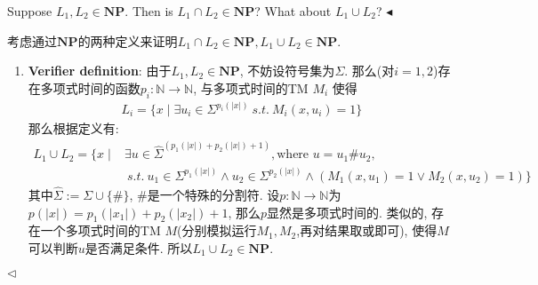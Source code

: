 \documentclass[11pt]{article}
\newcommand{\NP}{\mathbf{NP}}
\newenvironment{problem}[2][Problem]{\begin{trivlist}
\item[\hskip \labelsep{\bfseries#1}\hskip\labelsep{\bfseries#2.}]}{\hfill$\blacktriangleleft$\end{trivlist}}
\newenvironment{answer}[1][Answer]{\begin{trivlist}
\item[\hskip \labelsep{\bfseries\itshape#1.}\hskip \labelsep]}{\hfill$\lhd$\end{trivlist}}
\begin{document}
\begin{problem}{2.(14 points)}
    Suppose $L_1, L_2 \in \NP$. Then is $L_1 \cap L_2 \in \mathbf{NP}$? What about $L_1 \cup L_2$?
\end{problem}
\begin{answer}
   考虑通过$\NP$的两种定义来证明$L_1\cap L_2 \in \NP, L_1\cup L_2 \in \NP$.
   \begin{enumerate}[label = (\arabic*)]
    \item \textbf{Verifier definition}: 由于$L_1, L_2 \in \NP$, 不妨设符号集为$\Sigma$. 那么(对$i = 1,2$)存在多项式时间的函数$p_i: \mathbb{N} \rightarrow \mathbb{N}$, 与多项式时间的TM $M_i$ 使得
    \begin{align*}
        L_i = \{x \mid \exists u_i \in \Sigma^{p_i(|x|)} ~s.t.~ M_i(x,u_i) = 1\} 
    \end{align*}
    那么根据定义有:
    \begin{align*}
        L_1 \cup L_2 = \{x \mid &\exists u \in \widehat{\Sigma}^{(p_1(|x|) + p_2(|x|) + 1)}, \text{where }u = u_1\#u_2, \\
        &~s.t.~ u_1 \in \Sigma^{p_1(|x|)} \land u_2 \in \Sigma^{p_2(|x|)} \land(M_1(x,u_1) = 1 \lor M_2(x,u_2) = 1) \}  
    \end{align*}
    其中$\widehat{\Sigma} := \Sigma \cup \{\#\}$, $\#$是一个特殊的分割符. 设$p: \mathbb{N} \rightarrow \mathbb{N}$为$p(|x|) = p_1(|x_1|) + p_2(|x_2|)+1$, 那么$p$显然是多项式时间的. 类似的, 存在一个多项式时间的TM $M$(分别模拟运行$M_1,M_2$,再对结果取或即可), 使得$M$可以判断$u$是否满足条件. 所以$L_1 \cup L_2 \in \NP$. 


\end{enumerate}
\end{answer}
\end{document}
